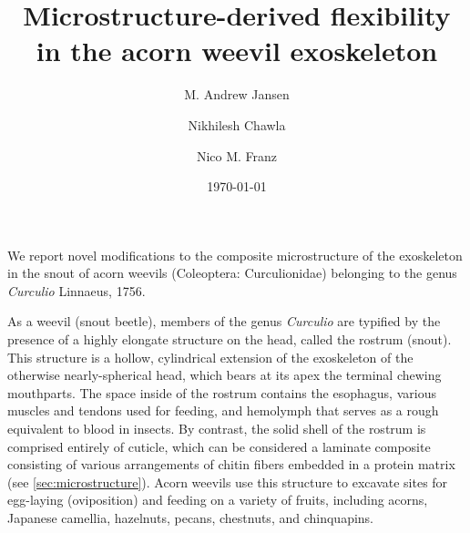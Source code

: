 \documentclass[twocolumn, linenumbers, superscriptaddress]{revtex4-1}
\begin{document}
	\begin{abstract}
		\blindtext
	\end{abstract}
	
	{\title{Microstructure-derived flexibility in the acorn weevil exoskeleton}
	
	\date{\today}
	
	\author{M. Andrew Jansen}
	\author{Nikhilesh Chawla}
	\author{Nico M. Franz}
		
	\maketitle
	}
	
	
	We report novel modifications to the composite microstructure of the exoskeleton in the snout of acorn weevils (Coleoptera: Curculionidae) belonging to the genus \textit{Curculio} Linnaeus, 1756.

	As a weevil (snout beetle), members of the genus \textit{Curculio} are typified by the presence of a highly elongate structure on the head, called the rostrum (snout). 
	This structure is a hollow, cylindrical extension of the exoskeleton of the otherwise nearly-spherical head, which bears at its apex the terminal chewing mouthparts. 
	The space inside of the rostrum contains the esophagus, various muscles and tendons used for feeding, and hemolymph that serves as a rough equivalent to blood in insects.
	By contrast, the solid shell of the rostrum is comprised entirely of cuticle, which can be considered a laminate composite consisting of various arrangements of chitin fibers embedded in a protein matrix (see \cref{sec:microstructure}).
	Acorn weevils use this structure to excavate sites for egg-laying (oviposition) and feeding on a variety of fruits, including acorns, Japanese camellia, hazelnuts, pecans, chestnuts, and chinquapins. 
		
\end{document}
